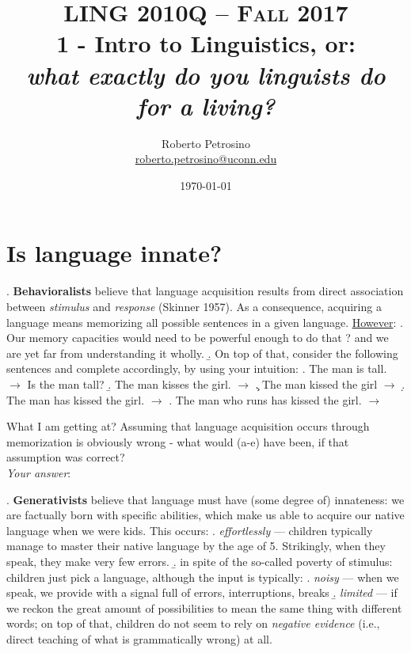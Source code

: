 \documentclass[11pt, oneside]{article}   	%
\title{{\normalsize LING 2010Q -- {\scshape Fall 2017}} \\ {\bfseries 1 - Intro to Linguistics}, or: \\ {\itshape what exactly do you linguists do for a living?}}
\author{Roberto Petrosino \\ \url{roberto.petrosino@uconn.edu}}
\date{\today}
\begin{document}
\maketitle
\tableofcontents

\newpage

\section{Is language innate?}

\ex. {\bfseries Behavioralists} believe that language acquisition results from direct association between {\itshape stimulus} and {\itshape response} (Skinner 1957). As a consequence, acquiring a language means memorizing all possible sentences in a given language. \underline{However}:
\a. Our memory capacities would need to be powerful enough to do that ? and we are yet far from understanding it wholly.
\b. On top of that, consider the following sentences and complete accordingly, by using your intuition:
	\a. The man is tall.  			\hfill	$\rightarrow$  \hspace{0.2cm} 	Is the man tall?
	\b. The man kisses the girl. 	\hfill	$\rightarrow$  \hspace{0.2cm}	\underline{\hspace{2.65cm}}
	\c. The man kissed the girl 	\hfill	$\rightarrow$  \hspace{0.2cm}	\underline{\hspace{2.65cm}}	
	\d. The man has kissed the girl.  \hfill	$\rightarrow$  \hspace{0.2cm}	\underline{\hspace{2.65cm}}
	\e. The man who runs has kissed the girl. 	\hfill	$\rightarrow$  \hspace{0.2cm}	\underline{\hspace{2.65cm}}

What I am getting at? Assuming that language acquisition occurs through memorization is obviously wrong - what would (a-e) have been, if that assumption was correct? \\

{\itshape Your answer}:

\vspace{1.5cm}

\ex. {\bfseries Generativists} believe that language must have (some degree of) innateness: we are factually born with specific abilities, which make us able to acquire our native language when we were kids. This occurs:
\a. {\itshape effortlessly} --- children typically manage to master their native language by the age of 5. Strikingly, when they speak, they make very few errors.
\b. in spite of the so-called poverty of stimulus: children just pick a language, although the input is typically:
	\a. {\itshape noisy} --- when we speak, we provide with a signal full of errors, interruptions, breaks
	\b. {\itshape limited} --- if we reckon the great amount of possibilities to mean the same thing with different words; on top of that, children do not seem to rely on {\itshape negative evidence} (i.e., direct teaching of what is grammatically wrong) at all.
\end{document}
